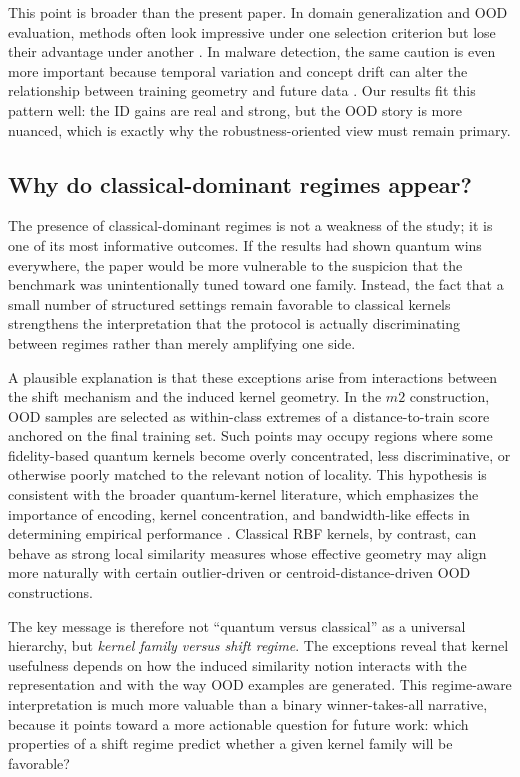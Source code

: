 \documentclass[pdflatex,sn-mathphys-num]{sn-jnl}%
\theoremstyle{thmstyleone}%
\theoremstyle{thmstyletwo}%
\theoremstyle{thmstylethree}%
\begin{document}
This point is broader than the present paper. In domain generalization and OOD evaluation, methods often look impressive under one selection criterion but lose their advantage under another \cite{gulrajani2021domainbed}. In malware detection, the same caution is even more important because temporal variation and concept drift can alter the relationship between training geometry and future data \cite{barbero2022transcending,li2025revisitingdrift}. Our results fit this pattern well: the ID gains are real and strong, but the OOD story is more nuanced, which is exactly why the robustness-oriented view must remain primary.

\subsection{Why do classical-dominant regimes appear?}

The presence of classical-dominant regimes is not a weakness of the study; it is one of its most informative outcomes. If the results had shown quantum wins everywhere, the paper would be more vulnerable to the suspicion that the benchmark was unintentionally tuned toward one family. Instead, the fact that a small number of structured settings remain favorable to classical kernels strengthens the interpretation that the protocol is actually discriminating between regimes rather than merely amplifying one side.

A plausible explanation is that these exceptions arise from interactions between the shift mechanism and the induced kernel geometry. In the $m2$ construction, OOD samples are selected as within-class extremes of a distance-to-train score anchored on the final training set. Such points may occupy regions where some fidelity-based quantum kernels become overly concentrated, less discriminative, or otherwise poorly matched to the relevant notion of locality. This hypothesis is consistent with the broader quantum-kernel literature, which emphasizes the importance of encoding, kernel concentration, and bandwidth-like effects in determining empirical performance \cite{schuld2021encoding,huang2021powerofdata,gilfuster2024rethinkinggeneralization,schnabel2025scrutiny}. Classical RBF kernels, by contrast, can behave as strong local similarity measures whose effective geometry may align more naturally with certain outlier-driven or centroid-distance-driven OOD constructions.

The key message is therefore not ``quantum versus classical'' as a universal hierarchy, but \emph{kernel family versus shift regime}. The exceptions reveal that kernel usefulness depends on how the induced similarity notion interacts with the representation and with the way OOD examples are generated. This regime-aware interpretation is much more valuable than a binary winner-takes-all narrative, because it points toward a more actionable question for future work: which properties of a shift regime predict whether a given kernel family will be favorable?
\end{document}
